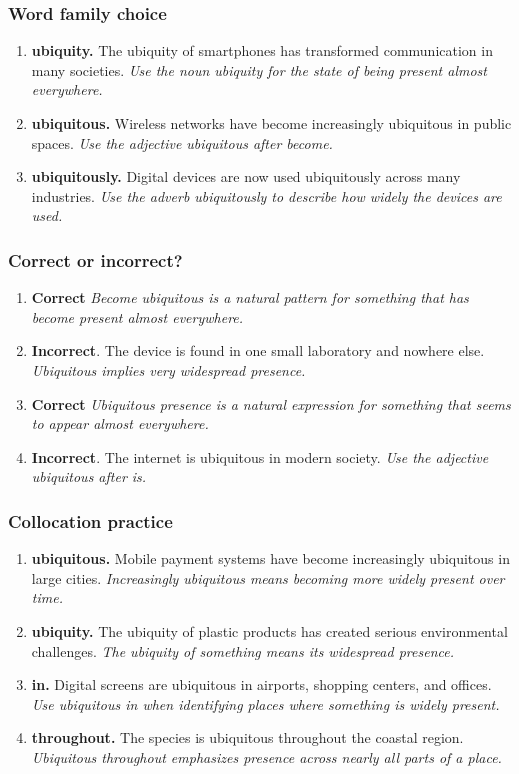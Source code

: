 \documentclass[11pt]{article}
\begin{document}
\subsubsection{Word family choice}
\begin{enumerate}
  \item \textbf{ubiquity.} The ubiquity of smartphones has transformed communication in many societies. \emph{Use the noun ubiquity for the state of being present almost everywhere.}
  \item \textbf{ubiquitous.} Wireless networks have become increasingly ubiquitous in public spaces. \emph{Use the adjective ubiquitous after become.}
  \item \textbf{ubiquitously.} Digital devices are now used ubiquitously across many industries. \emph{Use the adverb ubiquitously to describe how widely the devices are used.}
\end{enumerate}

\subsubsection{Correct or incorrect?}
\begin{enumerate}
  \item \textbf{Correct} \emph{Become ubiquitous is a natural pattern for something that has become present almost everywhere.}
  \item \textbf{Incorrect}. The device is found in one small laboratory and nowhere else. \emph{Ubiquitous implies very widespread presence.}
  \item \textbf{Correct} \emph{Ubiquitous presence is a natural expression for something that seems to appear almost everywhere.}
  \item \textbf{Incorrect}. The internet is ubiquitous in modern society. \emph{Use the adjective ubiquitous after is.}
\end{enumerate}

\subsubsection{Collocation practice}
\begin{enumerate}
  \item \textbf{ubiquitous.} Mobile payment systems have become increasingly ubiquitous in large cities. \emph{Increasingly ubiquitous means becoming more widely present over time.}
  \item \textbf{ubiquity.} The ubiquity of plastic products has created serious environmental challenges. \emph{The ubiquity of something means its widespread presence.}
  \item \textbf{in.} Digital screens are ubiquitous in airports, shopping centers, and offices. \emph{Use ubiquitous in when identifying places where something is widely present.}
  \item \textbf{throughout.} The species is ubiquitous throughout the coastal region. \emph{Ubiquitous throughout emphasizes presence across nearly all parts of a place.}
\end{enumerate}
\end{document}
